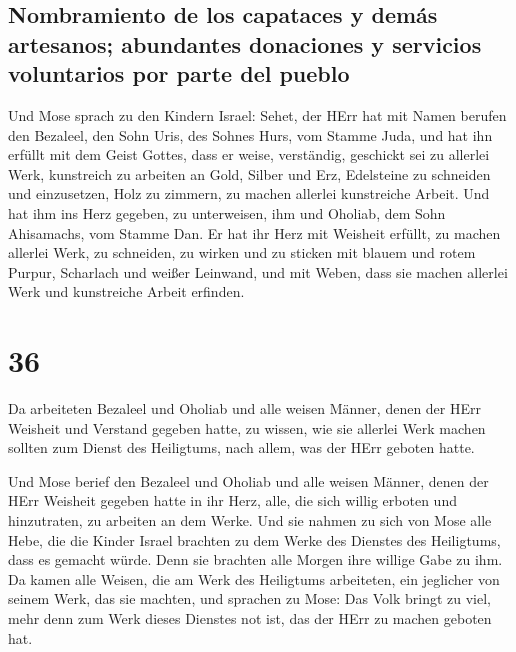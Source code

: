 \hypertarget{nombramiento-de-los-capataces-y-demuxe1s-artesanos-abundantes-donaciones-y-servicios-voluntarios-por-parte-del-pueblo}{%
\subsection{Nombramiento de los capataces y demás artesanos; abundantes
donaciones y servicios voluntarios por parte del
pueblo}\label{nombramiento-de-los-capataces-y-demuxe1s-artesanos-abundantes-donaciones-y-servicios-voluntarios-por-parte-del-pueblo}}

 Und Mose sprach zu den Kindern Israel: Sehet, der HErr
hat mit Namen berufen den Bezaleel, den Sohn Uris, des Sohnes Hurs, vom
Stamme Juda,  und hat ihn erfüllt mit dem Geist Gottes,
dass er weise, verständig, geschickt sei zu allerlei Werk,
 kunstreich zu arbeiten an Gold, Silber und Erz,
 Edelsteine zu schneiden und einzusetzen, Holz zu
zimmern, zu machen allerlei kunstreiche Arbeit.  Und hat
ihm ins Herz gegeben, zu unterweisen, ihm und Oholiab, dem Sohn
Ahisamachs, vom Stamme Dan.  Er hat ihr Herz mit Weisheit
erfüllt, zu machen allerlei Werk, zu schneiden, zu wirken und zu sticken
mit blauem und rotem Purpur, Scharlach und weißer Leinwand, und mit
Weben, dass sie machen allerlei Werk und kunstreiche Arbeit erfinden.

\hypertarget{section-35}{%
\section{36}\label{section-35}}

 Da arbeiteten Bezaleel und Oholiab und alle weisen
Männer, denen der HErr Weisheit und Verstand gegeben hatte, zu wissen,
wie sie allerlei Werk machen sollten zum Dienst des Heiligtums, nach
allem, was der HErr geboten hatte.

 Und Mose berief den Bezaleel und Oholiab und alle weisen
Männer, denen der HErr Weisheit gegeben hatte in ihr Herz, alle, die
sich willig erboten und hinzutraten, zu arbeiten an dem Werke.
 Und sie nahmen zu sich von Mose alle Hebe, die die Kinder
Israel brachten zu dem Werke des Dienstes des Heiligtums, dass es
gemacht würde. Denn sie brachten alle Morgen ihre willige Gabe zu ihm.
 Da kamen alle Weisen, die am Werk des Heiligtums
arbeiteten, ein jeglicher von seinem Werk, das sie machten,
 und sprachen zu Mose: Das Volk bringt zu viel, mehr denn
zum Werk dieses Dienstes not ist, das der HErr zu machen geboten hat.


